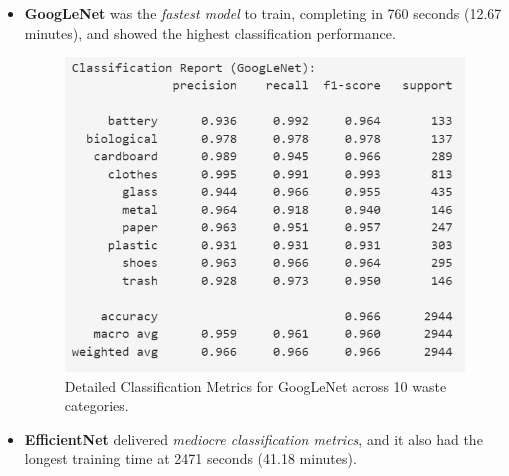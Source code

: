 \documentclass[11pt,twocolumn]{article}
\begin{document}
\begin{itemize}
    \item \textbf{GoogLeNet} was the \textit{fastest model} to train, completing in 760 seconds (12.67 minutes), and showed the highest classification performance.

    

    \begin{figure}[h]
        \centering
        \includegraphics[width=\linewidth]{report_images/gnet_metrics.png}
        \caption{Detailed Classification Metrics for GoogLeNet across 10 waste categories.}
        \label{fig:gnet_metrics}
    \end{figure}




    \item \textbf{EfficientNet} delivered \textit{mediocre classification metrics}, and it also had the longest training time at 2471 seconds (41.18 minutes).

    \vspace{1cm}


\end{itemize}
\end{document}
